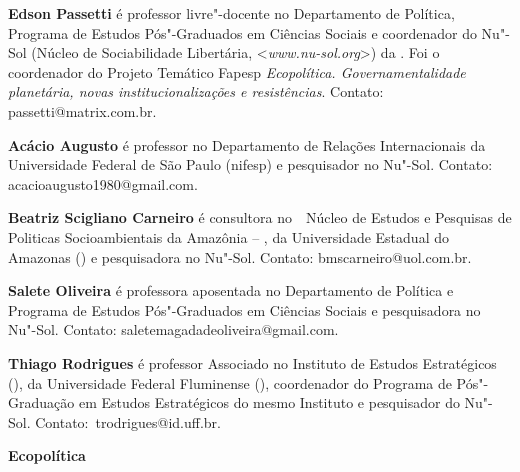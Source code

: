 \textbf{Edson Passetti} é professor livre"-docente no Departamento de Política, Programa de Estudos Pós"-Graduados em Ciências Sociais e coordenador do Nu"-Sol (Núcleo de Sociabilidade Libertária, \textless{}\emph{www.nu-sol.org}\textgreater{}) da . Foi o coordenador do Projeto Temático Fapesp \emph{Ecopolítica. Governamentalidade planetária, novas institucionalizações e resistências}. Contato: passetti@matrix.com.br.

\textbf{Acácio Augusto} é professor no Departamento de Relações Internacionais da Universidade Federal de São Paulo (nifesp) e pesquisador no Nu"-Sol. Contato: acacioaugusto1980@gmail.com.

\textbf{Beatriz Scigliano Carneiro} é consultora no  Núcleo de Estudos e Pesquisas de Politicas Socioambientais da Amazônia -- , da Universidade Estadual do Amazonas () e pesquisadora no Nu"-Sol. Contato: bmscarneiro@uol.com.br.

\textbf{Salete Oliveira} é professora aposentada no Departamento de Política e Programa de Estudos Pós"-Graduados em Ciências Sociais e pesquisadora no Nu"-Sol. Contato: saletemagadadeoliveira@gmail.com.

\textbf{Thiago Rodrigues} é professor Associado no Instituto de Estudos Estratégicos (), da Universidade Federal Fluminense (), coordenador do Programa de Pós"-Graduação em Estudos Estratégicos do mesmo Instituto e pesquisador do Nu"-Sol. Contato: trodrigues@id.uff.br.

\textbf{Ecopolítica} \lipsum [2]





